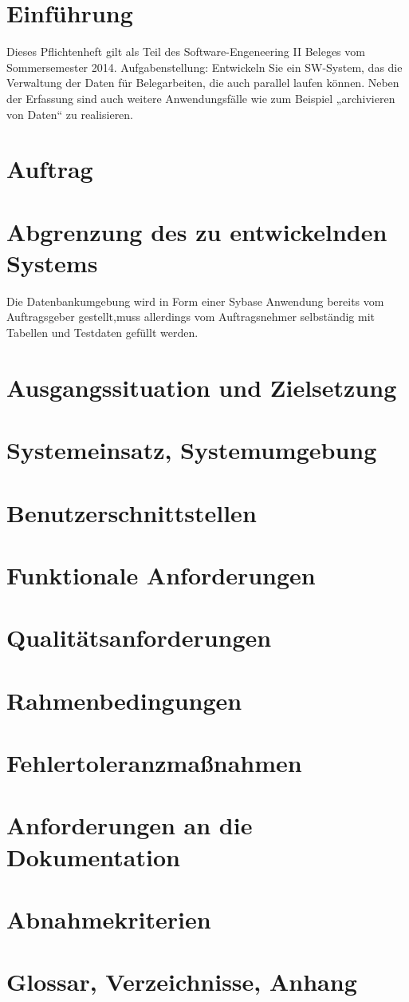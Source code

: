 \part{Einführung} 

Dieses Pflichtenheft gilt als Teil des Software-Engeneering II Beleges vom Sommersemester 2014.
Aufgabenstellung:
Entwickeln  Sie ein SW-System, das die Verwaltung der Daten für Belegarbeiten, die auch parallel laufen können. Neben der Erfassung sind auch weitere Anwendungsfälle wie zum Beispiel „archivieren von Daten“ zu realisieren.


\part{Auftrag}


\part{Abgrenzung des zu entwickelnden Systems}
Die Datenbankumgebung wird in Form einer Sybase Anwendung bereits vom Auftragsgeber gestellt,muss allerdings vom Auftragsnehmer selbständig mit Tabellen und Testdaten gefüllt werden.
 
\part{Ausgangssituation und Zielsetzung}


\part{Systemeinsatz, Systemumgebung}


\part{Benutzerschnittstellen}


\part{Funktionale Anforderungen}


\part{Qualitätsanforderungen}


\part{Rahmenbedingungen}


\part{Fehlertoleranzmaßnahmen}


\part{Anforderungen an die Dokumentation}


\part{Abnahmekriterien}


\part{Glossar, Verzeichnisse, Anhang}

